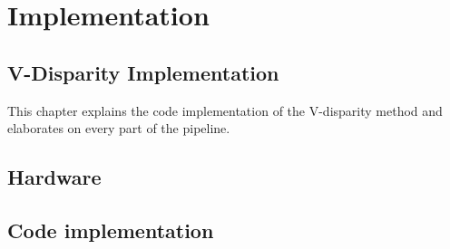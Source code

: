
\chapter{Implementation}
\label{chp:Implementation}


\section{V-Disparity Implementation}
\label{vdisp_impl}

This chapter explains the code implementation of the V-disparity method and elaborates on every part of the pipeline.

\section{Hardware}

\section{Code implementation}
